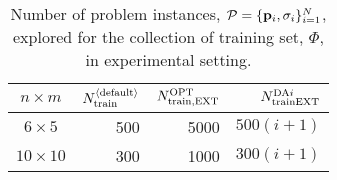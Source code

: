 \begin{table}[t]
\centering
\begin{tabular}{crrr} \toprule
$n \times m$  & $N_{\text{train}}^{\langle \text{default} \rangle}$ 
                     & $N_{\text{train},\text{EXT}}^{\text{OPT}}$ 
                              & $N_{\text{train}\text{EXT}}^{\text{DA}i}$ \\ \midrule
$6\times 5$   & 500  & 5000   & $500(i+1)$ \\
$10\times 10$ & 300  & 1000   & $300(i+1)$ \\
\bottomrule
\end{tabular}
\caption{Number of problem instances, 
$\mathcal{P}=\{\mathbf{p}_i,{\mathbf{\sigma}}_i\}_{i=1}^{N}$, explored for the collection of 
training set, $\Phi$, in experimental setting.}
\label{tbl:Ntrain}
\end{table}